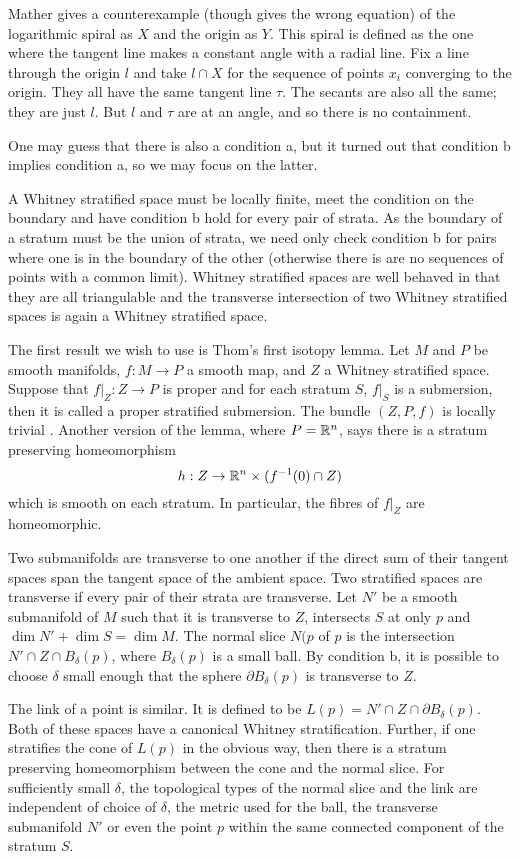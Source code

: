 Mather\cite[Example 2.5]{Mather1970} gives a counterexample (though gives the wrong equation) of the logarithmic spiral as $X$ and the origin as $Y$. This spiral is defined as the one where the tangent line makes a constant angle with a radial line. Fix a line through the origin $l$ and take $l\cap X$ for the sequence of points $x_i$ converging to the origin. They all have the same tangent line $τ$. The secants are also all the same; they are just $l$. But $l$ and $τ$ are at an angle, and so there is no containment.

One may guess that there is also a condition a, but it turned out that condition b implies condition a, so we may focus on the latter.

A Whitney stratified space must be locally finite, meet the condition on the boundary and have condition b hold for every pair of strata. As the boundary of a stratum must be the union of strata, we need only check condition b for pairs where one is in the boundary of the other (otherwise there is are no sequences of points with a common limit). Whitney stratified spaces are well behaved in that they are all triangulable and the transverse intersection of two Whitney stratified spaces is again a Whitney stratified space.

The first result we wish to use is Thom's first isotopy lemma. Let $M$ and $P$ be smooth manifolds, $f: M \to P$ a smooth map, and $Z$ a Whitney stratified space. Suppose that $f|_Z : Z \to P$ is proper and for each stratum $S$, $f|_S$ is a submersion, then it is called a proper stratified submersion. The bundle $(Z,P,f)$ is locally trivial \cite[Prop 11.1]{Mather1970}. Another version\cite[p41]{Goresky1989} of the lemma, where $P=\mathbb{R}^n$, says there is a stratum preserving homeomorphism
\[
h : Z \to \mathbb{R}^n\times(f^{-1}(0) \cap Z)
\]
which is smooth on each stratum. In particular, the fibres of $f|_Z$ are homeomorphic.

Two submanifolds are transverse to one another if the direct sum of their tangent spaces span the tangent space of the ambient space. Two stratified spaces are transverse if every pair of their strata are transverse.  Let $N'$ be a smooth submanifold of $M$ such that it is transverse to $Z$, intersects $S$ at only $p$ and $\dim N' + \dim S = \dim M$. The normal slice $N(p$ of $p$ is the intersection $ N' \cap Z \cap B_δ(p)$, where $B_δ(p)$ is a small ball. By condition b, it is possible to choose $δ$ small enough that the sphere $\partial B_δ(p)$ is transverse to $Z$.

The link of a point is similar. It is defined to be $L(p) = N' \cap Z \cap \partial B_δ(p)$. Both of these spaces have a canonical Whitney stratification. Further, if one stratifies the cone of $L(p)$ in the obvious way, then there is a stratum preserving homeomorphism between the cone and the normal slice. For sufficiently small $δ$, the topological types of the normal slice and the link are independent of choice of $δ$, the metric used for the ball, the transverse submanifold $N'$ or even the point $p$ within the same connected component of the stratum $S$.

